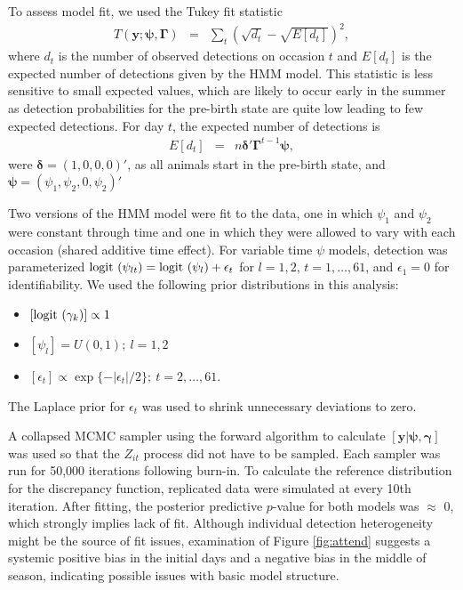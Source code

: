 \documentclass[12pt,english]{article}
\begin{document}
\begin{spacing}{1.9}
 To assess model fit, we used the Tukey fit statistic
 \begin{eqnarray*}
 T(\mathbf{y}; \boldsymbol{\psi},\boldsymbol{\Gamma}) & = &  \sum_t\left(\sqrt{d_t} - \sqrt{E[d_t]}\right)^2,
 \end{eqnarray*}
 where $d_t$ is the number of observed detections on occasion $t$ and $E[d_t]$ is the expected number of detections given by the HMM model. This statistic is less sensitive to small expected values, which are likely to occur early in the summer as detection probabilities for the pre-birth state are quite low leading to few expected detections. For day $t$, the expected number of detections is
 \begin{eqnarray*}
 E[d_t] & = & n \boldsymbol{\delta}'\boldsymbol{\Gamma}^{t-1}\boldsymbol{\psi},
 \end{eqnarray*}
 were $\boldsymbol{\delta} = (1, 0, 0, 0)'$, as all animals start in the pre-birth state, and $\boldsymbol{\psi} = (\psi_1 , \psi_2 , 0 , \psi_2)'$

 Two versions of the HMM model were fit to the data, one in which $\psi_1$ and $\psi_2$ were constant through time and one in which they were allowed to vary with each occasion (shared additive time effect). For variable time $\psi$ models, detection was parameterized ${\rm logit}\ (\psi_{lt}) = \mbox{logit } (\psi_l) + \epsilon_t$ for $l=1,2$, $t=1,\dots,61$, and $\epsilon_1 = 0$ for identifiability. We used the following prior distributions in this analysis:
 \begin{itemize}
 \item $[{\rm logit}\ (\gamma_k)] \propto 1$
 \item $[\psi_l] = U(0,1);\ l=1,2$
 \item $[\epsilon_t] \propto \exp\{-|\epsilon_t|/2\};\ t=2,\dots,61$.
 \end{itemize}
  The Laplace prior for $\epsilon_t$ was used to shrink unnecessary deviations to zero.

 A collapsed MCMC sampler using the forward algorithm to calculate $[\mathbf{y}|\boldsymbol{\psi},\boldsymbol{\gamma}]$ was used so that the $Z_{it}$ process did not have to be sampled. Each sampler was run for 50,000 iterations following burn-in. To calculate the reference distribution for the discrepancy function, replicated data were simulated at every 10th iteration. After fitting, the posterior predictive $p$-value for both models was $\approx$ 0, which strongly implies lack of fit.  Although individual detection heterogeneity might be the source of fit issues, examination of Figure \ref{fig:attend} suggests a systemic positive bias in the initial days and a negative bias in the middle of season, indicating possible issues with basic model structure.


\end{spacing}
\end{document}
